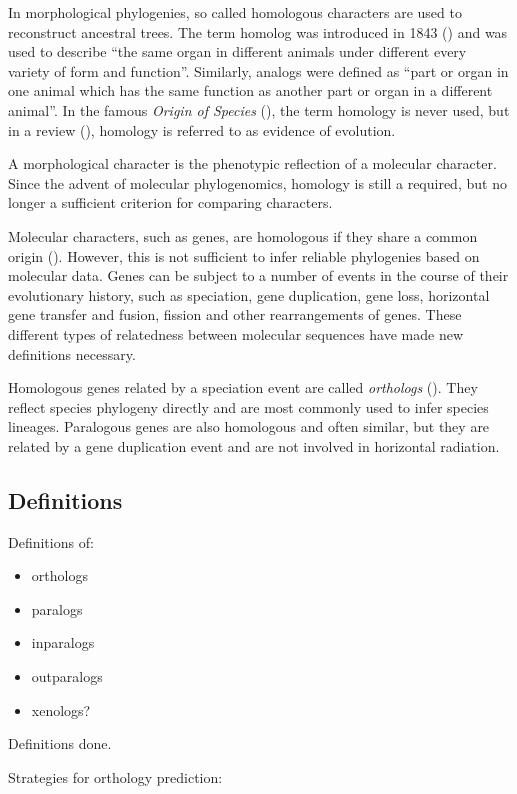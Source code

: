 In morphological phylogenies, so called homologous characters are used to
reconstruct ancestral trees. The term homolog was introduced in 1843
(\cite{owen1848}) and was used to describe ``the same organ in different animals
under different every variety of form and function''. Similarly, analogs were
defined as ``part or organ in one animal which has the same function as another
part or organ in a different animal''. In the famous \emph{Origin of Species}
(\cite{darwin1859}), the term homology is never used, but in a review
(\cite{owen1860}), homology is referred to as evidence of evolution.

A morphological character is the phenotypic reflection of a molecular character.
Since the advent of molecular phylogenomics, homology is still a required, but
no longer a sufficient criterion for comparing characters.

Molecular characters, such as genes, are homologous if they share a common
origin (\cite{koonin2005}). However, this is not sufficient to infer reliable
phylogenies based on molecular data. Genes can be subject to a number of events
in the course of their evolutionary history, such as speciation, gene
duplication, gene loss, horizontal gene transfer and fusion, fission and other
rearrangements of genes. These different types of relatedness between molecular
sequences have made new definitions necessary.

Homologous genes related by a speciation event are called \emph{orthologs}
(\cite{fitch1970}). They reflect species phylogeny directly and are most
commonly used to infer species lineages. Paralogous genes are also homologous
and often similar, but they are related by a gene duplication event and are not
involved in horizontal radiation.


\subsection{Definitions}

Definitions of:
\begin{itemize}
	\item orthologs
	\item paralogs
	\item inparalogs
	\item outparalogs
	\item xenologs?
\end{itemize}

Definitions done.

Strategies for orthology prediction:

